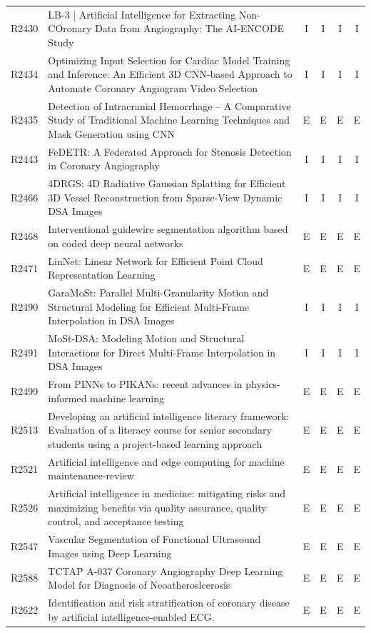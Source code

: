 \begin{longtable}{@{}l p{8.6cm} c c c c@{}}
R2430 & LB-3 | Artificial Intelligence for Extracting Non-COronary Data from Angiography: The AI-ENCODE Study & I & I & I & I \\
R2434 & Optimizing Input Selection for Cardiac Model Training and Inference: An Efficient 3D CNN-based Approach to Automate Coronary Angiogram Video Selection & I & I & I & I \\
R2435 & Detection of Intracranial Hemorrhage -- A Comparative Study of Traditional Machine Learning Techniques and Mask Generation using CNN & E & E & E & E \\
R2443 & FeDETR: A Federated Approach for Stenosis Detection in Coronary Angiography & I & I & I & I \\
R2466 & 4DRGS: 4D Radiative Gaussian Splatting for Efficient 3D Vessel Reconstruction from Sparse-View Dynamic DSA Images & I & I & I & I \\
R2468 & Interventional guidewire segmentation algorithm based on coded deep neural networks & E & E & E & E \\
R2471 & LinNet: Linear Network for Efficient Point Cloud Representation Learning & E & E & E & E \\
R2490 & GaraMoSt: Parallel Multi-Granularity Motion and Structural Modeling for Efficient Multi-Frame Interpolation in DSA Images & I & I & I & I \\
R2491 & MoSt-DSA: Modeling Motion and Structural Interactions for Direct Multi-Frame Interpolation in DSA Images & I & I & I & I \\
R2499 & From PINNs to PIKANs: recent advances in physics-informed machine learning & E & E & E & E \\
R2513 & Developing an artificial intelligence literacy framework: Evaluation of a literacy course for senior secondary students using a project-based learning approach & E & E & E & E \\
R2521 & Artificial intelligence and edge computing for machine maintenance-review & E & E & E & E \\
R2526 & Artificial intelligence in medicine: mitigating risks and maximizing benefits via quality assurance, quality control, and acceptance testing & E & E & E & E \\
R2547 & Vascular Segmentation of Functional Ultrasound Images using Deep Learning & E & E & E & E \\
R2588 & TCTAP A-037 Coronary Angiography Deep Learning Model for Diagnosis of Neoatheroslcerosis & E & E & E & E \\
R2622 & Identification and risk stratification of coronary disease by artificial intelligence-enabled ECG. & E & E & E & E \\

\end{longtable}
